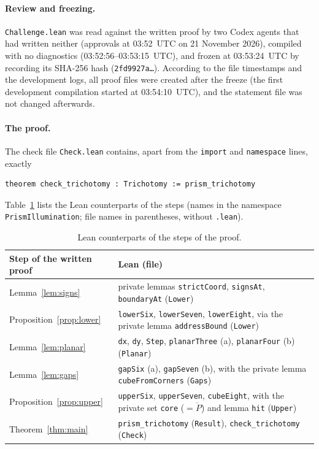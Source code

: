 \documentclass[11pt]{article}
\theoremstyle{definition}
\theoremstyle{remark}
\begin{document}
{\paragraph{Review and freezing.} \texttt{Challenge.lean} was read against the
written proof by two Codex agents that had written neither (approvals at
03:52~UTC on 21 November 2026), compiled with no diagnostics
(03:52:56--03:53:15~UTC), and frozen at 03:53:24~UTC by recording its SHA-256
hash (\texttt{2fd9927a\ldots}). According to the file timestamps and the development
logs, all proof files were created after the freeze (the first development
compilation started at 03:54:10~UTC), and the
statement file was not changed afterwards.

\paragraph{The proof.} The check file \texttt{Check.lean} contains, apart from
the \texttt{import} and \texttt{namespace} lines, exactly
{\footnotesize
\begin{verbatim}
theorem check_trichotomy : Trichotomy := prism_trichotomy
\end{verbatim}}
\noindent Table~\ref{tab:lean} lists the Lean counterparts of the steps (names
in the namespace \texttt{PrismIllumination}; file names in parentheses,
without \texttt{.lean}).

\begin{table}[!htbp]
\centering\footnotesize
\renewcommand{\arraystretch}{1.05}
\begin{tabular}{@{}>{\raggedright\arraybackslash}p{}>{\raggedright\arraybackslash}p{}@{}}
\hline
Step of the written proof & Lean (file) \\
\hline
Lemma~\ref{lem:signs} & private lemmas \texttt{strictCoord}, \texttt{signsAt},
\texttt{boundaryAt} (\texttt{Lower}) \\
Proposition~\ref{prop:lower} & \texttt{lowerSix}, \texttt{lowerSeven},
\texttt{lowerEight}, via the private lemma \texttt{addressBound}
(\texttt{Lower}) \\
Lemma~\ref{lem:planar} & \texttt{dx}, \texttt{dy}, \texttt{Step},
\texttt{planarThree} (a), \texttt{planarFour} (b) (\texttt{Planar}) \\
Lemma~\ref{lem:gaps} & \texttt{gapSix} (a), \texttt{gapSeven} (b), with the
private lemma \texttt{cubeFromCorners} (\texttt{Gaps}) \\
Proposition~\ref{prop:upper} & \texttt{upperSix}, \texttt{upperSeven},
\texttt{cubeEight}, with the private set \texttt{core} ($=\mathring P$) and
lemma \texttt{hit} (\texttt{Upper}) \\
Theorem~\ref{thm:main} & \texttt{prism\_trichotomy} (\texttt{Result}),
\texttt{check\_trichotomy} (\texttt{Check}) \\
\hline
\end{tabular}
\caption{Lean counterparts of the steps of the proof.}
\label{tab:lean}
\end{table}

}
\end{document}

